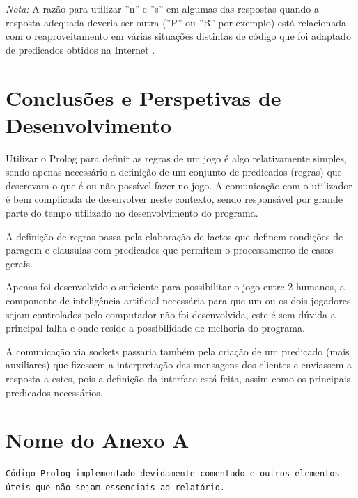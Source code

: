 \documentclass[15pt,a4paper]{article}
\begin{document}
\emph{Nota:} A razão para utilizar ''n'' e ''s'' em algumas das respostas quando a resposta adequada deveria ser outra (''P'' ou ''B'' por exemplo) está relacionada com o reaproveitamento em várias situações distintas de código que foi adaptado de predicados obtidos na Internet \cite{developerzen}.


\section{Conclusões e Perspetivas de Desenvolvimento}
Utilizar o Prolog para definir as regras de um jogo é algo relativamente simples, sendo apenas necessário a definição de um conjunto de predicados (regras) que descrevam o que é ou não possível fazer no jogo. A comunicação com o utilizador é bem complicada de desenvolver neste contexto, sendo responsável por grande parte do tempo utilizado no desenvolvimento do programa.


A definição de regras passa pela elaboração de factos que definem condições de paragem e clausulas com predicados que permitem o processamento de casos gerais.


Apenas foi desenvolvido o suficiente para possibilitar o jogo entre 2 humanos, a componente de inteligência artificial necessária para que um ou os dois jogadores sejam controlados pelo computador não foi desenvolvida, este é sem dúvida a principal falha e onde reside a possibilidade de melhoria do programa.


A comunicação via sockets passaria também pela criação de um predicado (mais auxiliares) que fizessem a interpretação das mensagens dos clientes e enviassem a resposta a estes, pois a definição da interface está feita, assim como os principais predicados necessários.


\clearpage
{}
\renewcommand\refname{Bibliografia}



\listoffigures

\newpage
\appendix
\section{Nome do Anexo A}
\begin{verbatim}
Código Prolog implementado devidamente comentado e outros elementos úteis que não sejam essenciais ao relatório.


\end{verbatim}
\end{document}
